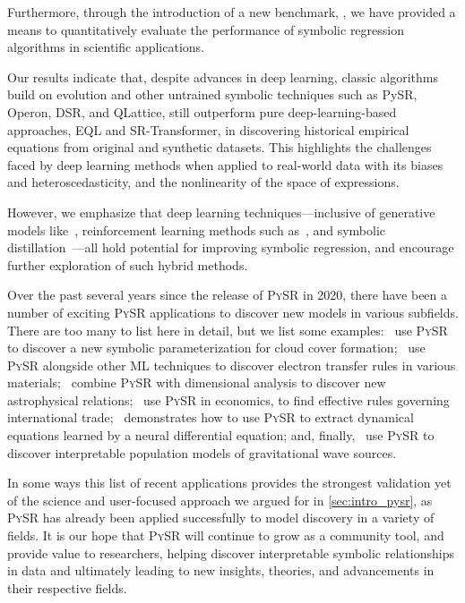 \documentclass[letterpaper,twocolumn]{scrartcl}
\newcommand\our{our\xspace}
\newcommand\pysr{\textsc{PySR}\xspace}
\begin{document}
Furthermore, through the introduction of a new benchmark, \bench, we have provided a means to quantitatively evaluate the performance of symbolic regression algorithms in scientific applications.

Our results indicate that, despite advances in deep learning, classic algorithms build on evolution and other untrained symbolic techniques such as PySR, Operon, DSR, and QLattice, still outperform pure deep-learning-based approaches, EQL and SR-Transformer, in discovering historical empirical equations from original and synthetic datasets.
This highlights the challenges faced by deep learning methods when applied to real-world data with its biases and heteroscedasticity, and the nonlinearity of the space of expressions.

However, we emphasize that deep learning techniques---inclusive of generative models like~\cite{kamiennyEndtoendSymbolicRegression2022}, reinforcement learning methods such as~\cite{petersenDeepSymbolicRegression2021}, and symbolic distillation~\cite{cranmerDiscoveringSymbolicModels2020}---all hold potential for improving symbolic regression, and encourage further exploration of such hybrid methods.

Over the past several years since the release of \pysr in 2020, there have been a number of exciting \pysr applications to discover new models in various subfields. There are too many to list here in detail, but we list some examples:~\cite{grundnerDataDrivenEquationDiscovery2023} use \pysr to discover a new symbolic parameterization for cloud cover formation;~\cite{liElectronTransferRules2023} use \pysr alongside other ML techniques to discover electron transfer rules in various materials;~\cite{matchevAnalyticalModelingExoplanet2022,wadekarSZFluxmassYM2022,wadekarAugmentingAstrophysicalScaling2022} combine \pysr with dimensional analysis to discover new astrophysical relations;~\cite{verstyukMachineLearningGravity2022} use \pysr in economics, to find effective rules governing international trade;~\cite{kidgerNeuralDifferentialEquations2022} demonstrates how to use \pysr to extract dynamical equations learned by a neural differential equation; and, finally,~\cite{wongAutomatedDiscoveryInterpretable2022} use \pysr to discover interpretable population models of gravitational wave sources.


In some ways this list of recent applications provides the strongest validation yet of the science and user-focused approach we argued for in \cref{sec:intro_pysr}, as \pysr has already been applied successfully to model discovery in a variety of fields.
It is \our hope that \pysr will continue to grow as a community tool, and provide value to researchers, helping discover interpretable symbolic relationships in data and ultimately leading to new insights, theories, and advancements in their respective fields.
\end{document}
